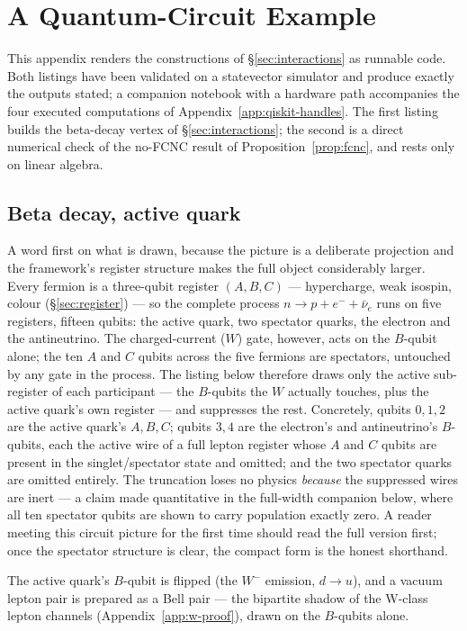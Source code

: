 \section{A Quantum-Circuit Example}
\label{app:qiskit}

This appendix renders the constructions of \S\ref{sec:interactions} as runnable code. Both listings
have been validated on a statevector simulator and produce exactly the outputs stated; a companion
notebook with a hardware path accompanies the four executed computations of
Appendix~\ref{app:qiskit-handles}. The first listing builds the beta-decay vertex of
\S\ref{sec:interactions}; the second is a direct
numerical check of the no-FCNC result of Proposition~\ref{prop:fcnc}, and rests only on linear
algebra.

\subsection{Beta decay, active quark}

A word first on what is drawn, because the picture is a deliberate projection and the framework's
register structure makes the full object considerably larger. Every fermion is a three-qubit
register $(A, B, C)$ --- hypercharge, weak isospin, colour (\S\ref{sec:register}) --- so the
complete process $n \to p + e^- + \bar\nu_e$ runs on five registers, fifteen qubits: the active
quark, two spectator quarks, the electron and the antineutrino. The charged-current ($W$) gate,
however, acts on the $B$-qubit alone; the ten $A$ and $C$ qubits across the five fermions are
spectators, untouched by any gate in the process. The listing below therefore draws only the active
sub-register of each participant --- the $B$-qubits the $W$ actually touches, plus the active
quark's own register --- and suppresses the rest. Concretely, qubits $0,1,2$ are the active quark's
$A,B,C$; qubits $3,4$ are the electron's and antineutrino's $B$-qubits, each the active wire of a
full lepton register whose $A$ and $C$ qubits are present in the singlet/spectator state and
omitted; and the two spectator quarks are omitted entirely. The truncation loses no physics
\emph{because} the suppressed wires are inert --- a claim made quantitative in the full-width
companion below, where all ten spectator qubits are shown to carry population exactly zero. A reader
meeting this circuit picture for the first time should read the full version first; once the
spectator structure is clear, the compact form is the honest shorthand.

The active quark's $B$-qubit is flipped (the $W^-$ emission, $d\to u$), and a vacuum lepton pair is
prepared as a Bell pair --- the bipartite shadow of the W-class lepton channels
(Appendix~\ref{app:w-proof}), drawn on the $B$-qubits alone.

